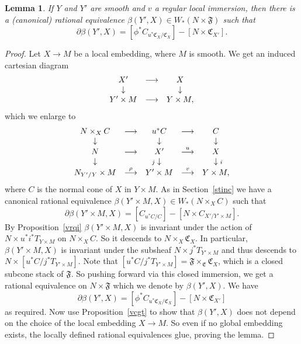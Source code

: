 \documentclass[11pt]{article}
\theoremstyle{plain}
\newtheorem{lem}[prop]{Lemma}
\theoremstyle{definition}
\newenvironment{pf}{\begin{proof}}{\end{proof}}
\newcommand{\upst}{^{\ast}}
\newcommand{\lst}{_{\ast}}
\newcommand{\EE}{{\mathfrak{E}}}
\newcommand{\FF}{{\mathfrak{F}}}
\newcommand{\CC}{{\mathfrak{C}}}
\newcommand{\del}{\partial}
\newcommand{\ldiag}[1]
       {\makebox[0cm]{\({\scriptstyle#1}\downarrow\phantom{\scriptstyle#1}\)}}
\newcommand{\rdiag}[1]
       {\makebox[0cm]{\(\phantom{\scriptstyle#1}\downarrow{\scriptstyle#1}\)}}
\newcommand{\comdia}[9]{
\begin{array}{ccc}
#1 & \stackrel{#2}{\longrightarrow} & #3 \\
\ldiag{#4} & #5 & \rdiag{#6} \\
#7 & \stackrel{#8}{\longrightarrow} & #9
\end{array}}
\theoremstyle{plain}
\theoremstyle{definition}
\theoremstyle{remark}
\begin{document}
\begin{lem} \label{ture}
If \(Y\) and \(Y'\) are smooth and \(v\) a regular local immersion, then
there is a (canonical) rational equivalence \(\beta(Y',X)\in
W\lst(N\times\FF)\) such that
\[
\del\beta(Y',X)=[\phi\upst
C_{u\upst\CC_X/\CC_X}]-[N\times\CC_{X'}].
\]
\end{lem}
\begin{pf}
Let \(X\to M\) be a local embedding, where \(M\) is smooth. We get an
induced cartesian diagram
\[
\comdia{X'}{}{X}{}{}{}{Y'\times M}{}{Y\times M,}
\]
which we enlarge to
\[
\begin{array}{ccccc}
N\times_XC & \longrightarrow & u\upst C & \longrightarrow & C \\
\ldiag{} & & \ldiag{} & & \rdiag{} \\
N & \longrightarrow & X' & \stackrel{u}{\longrightarrow} & X \\
\ldiag{} & & \ldiag{j} & & \rdiag{i} \\
N_{Y'/Y}\times M & \stackrel{\rho}{\longrightarrow} & Y'\times M &
\stackrel{v}{\longrightarrow} & Y\times M,
\end{array}
\]
where \(C\) is the normal cone of \(X\) in \(Y\times M\).
As in Section~\ref{stinc} we have a canonical rational equivalence
\(\beta(Y'\times M,X)\in W\lst(N\times_X C)\) such that
\[
\del\beta(Y'\times M,X)=[C_{u\upst C/C}]-[N\times C_{X'/Y'\times M}].
\]
By Proposition~\ref{vrqi} \(\beta(Y'\times M,X)\) is invariant under the
action of \(N\times u\upst i\upst T_{Y\times M} \) on \(N\times_X C\). So
it descends to \(N\times_X\CC_X\). In particular, \(\beta(Y'\times M,X)\)
is invariant under the subsheaf \(N\times j\upst T_{Y'\times M}\) and
thus descends to \(N\times[u\upst C/j\upst T_{Y'\times M}]\). Note that
\([u\upst C/j\upst T_{Y'\times M}]=\FF\times_{\EE}\CC_X\), which is a
closed subcone stack of \(\FF\). So pushing forward via this closed
immersion, we get a rational equivalence on \(N\times\FF\) which we
denote by \(\beta(Y',X)\). We have
\[
\del\beta(Y',X)=[\phi\upst
C_{u\upst\CC_X/\CC_X}]-[N\times\CC_{X'}]
\]
as required.
Now use Proposition~\ref{vcgt} to show that \(\beta(Y',X)\) does not
depend on the choice of the local embedding \(X\to M\). So even if no
global embedding exists, the locally defined rational equivalences
glue, proving the lemma.
\end{pf}
\end{document}
